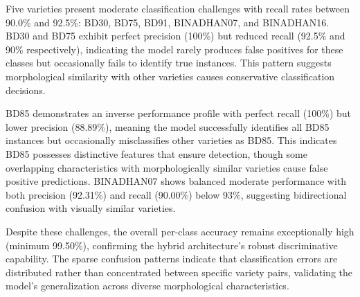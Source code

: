 \documentclass[conference]{IEEEtran}
\begin{document}
Five varieties present moderate classification challenges with recall rates between 90.0\% and 92.5\%: BD30, BD75, BD91, BINADHAN07, and BINADHAN16. BD30 and BD75 exhibit perfect precision (100\%) but reduced recall (92.5\% and 90\% respectively), indicating the model rarely produces false positives for these classes but occasionally fails to identify true instances. This pattern suggests morphological similarity with other varieties causes conservative classification decisions.

BD85 demonstrates an inverse performance profile with perfect recall (100\%) but lower precision (88.89\%), meaning the model successfully identifies all BD85 instances but occasionally misclassifies other varieties as BD85. This indicates BD85 possesses distinctive features that ensure detection, though some overlapping characteristics with morphologically similar varieties cause false positive predictions. BINADHAN07 shows balanced moderate performance with both precision (92.31\%) and recall (90.00\%) below 93\%, suggesting bidirectional confusion with visually similar varieties.

Despite these challenges, the overall per-class accuracy remains exceptionally high (minimum 99.50\%), confirming the hybrid architecture's robust discriminative capability. The sparse confusion patterns indicate that classification errors are distributed rather than concentrated between specific variety pairs, validating the model's generalization across diverse morphological characteristics.
\end{document}
